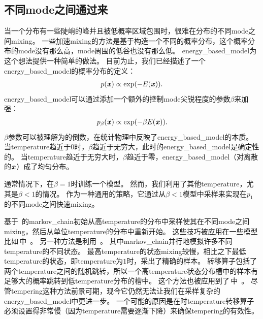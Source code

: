 \subsection{不同\gls{mode}之间通过来}
\label{sec:tempering_to_mix_between_modes}

当一个分布有一些陡峭的峰并且被低概率区域包围时，很难在分布的不同\gls{mode}之间\gls{mixing}。   %
一些加速\gls{mixing}的方法是基于构造一个不同的概率分布，这个概率分布的\gls{mode}没有那么高，\gls{mode}周围的低谷也没有那么低。
\gls{energy_based_model}为这个想法提供一种简单的做法。
目前为止，我们已经描述了一个\gls{energy_based_model}的概率分布的定义：   
\begin{align}
\label{eqn:1725}
p(\boldsymbol{\mathit{x}}) \propto \exp(-E(\boldsymbol{\mathit{x}})).
\end{align}
\gls{energy_based_model}可以通过添加一个额外的控制\gls{mode}尖锐程度的参数$\beta$来加强：
\begin{align}
\label{eqn:1726}
p_{\beta}(\boldsymbol{\mathit{x}}) \propto \exp(-\beta E(\boldsymbol{\mathit{x}})).
\end{align}
$\beta$参数可以被理解为的倒数，在统计物理中反映了\gls{energy_based_model}的本质。
当\gls{temperature}趋近于0时，$\beta$趋近于无穷大，此时的\gls{energy_based_model}是确定性的。
当\gls{temperature}趋近于无穷大时，$\beta$趋近于零，\gls{energy_based_model}（对离散的$\boldsymbol{\mathit{x}}$）成了均匀分布。

通常情况下，在$\beta = 1$时训练一个模型。
然而，我们利用了其他\gls{temperature}，尤其是$\beta < 1$的情况。
作为一种通用的策略，它通过从$\beta<1$模型中采样来实现在$p_1$的不同\gls{mode}之间快速\gls{mixing}。

基于~\citep{Neal94b}的\gls{markov_chain}初始从高\gls{temperature}的分布中采样使其在不同\gls{mode}之间\gls{mixing}，然后从单位\gls{temperature}的分布中重新开始。
这些技巧被应用在一些模型比如\,中~\citep{Salakhutdinov-2010}。
另一种方法是利用~\citep{Iba-2001}。
其中\gls{markov_chain}并行地模拟许多不同\gls{temperature}的不同状态。
最高\gls{temperature}的状态\gls{mixing}较慢，相比之下最低\gls{temperature}的状态，即\gls{temperature}为$1$时，采出了精确的样本。
转移算子包括了两个\gls{temperature}之间的随机跳转，所以一个高\gls{temperature}状态分布槽中的样本有足够大的概率跳转到低\gls{temperature}分布的槽中。
这个方法也被应用到了\,中~\citep{Desjardins+al-2010-small,Cho10IJCNN}。
尽管\gls{tempering}这种方法前景可期，现今它仍然无法让我们在采样复杂的\gls{energy_based_model}中更进一步。
一个可能的原因是在时\gls{temperature}转移算子必须设置得非常慢（因为\gls{temperature}需要逐渐下降）来确保\gls{tempering}的有效性。


